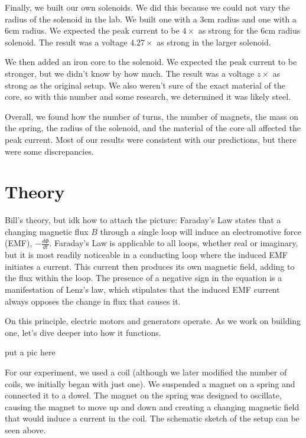 \documentclass[11pt]{article}
\let\oldsection\section
\renewcommand\section{\clearpage\oldsection}
\begin{document}
    Finally, we built our own solenoids.
    We did this because we could not vary the radius of the solenoid in the lab.
    We built one with a 3cm radius and one with a 6cm radius.
    We expected the peak current to be $4 \times$ as strong for the 6cm radius solenoid.
    The result was a voltage $4.27 \times$ as strong in the larger solenoid.

    We then added an iron core to the solenoid.
    We expected the peak current to be stronger, but we didn't know by how much.
    The result was a voltage $z \times$ as strong as the original setup.
    We also weren't sure of the exact material of the core, so with this number and some research, we determined it was likely steel.

    Overall, we found how the number of turns, the number of magnets, the mass on the spring, the radius of the solenoid, and the material of the core all affected the peak current.
    Most of our results were consistent with our predictions, but there were some discrepancies.

    \section*{Theory}\label{sec:theory}


Bill's theory, but idk how to attach the picture:
Faraday’s Law states that a changing magnetic flux \(B\) through a single loop will induce an electromotive force (EMF), \(-\frac{d\Phi}{dt}\). Faraday’s Law is applicable to all loops, whether real or imaginary, but it is most readily noticeable in a conducting loop where the induced EMF initiates a current. This current then produces its own magnetic field, adding to the flux within the loop. The presence of a negative sign in the equation is a manifestation of Lenz’s law, which stipulates that the induced EMF current always opposes the change in flux that causes it. 

On this principle, electric motors and generators operate. As we work on building one, let's dive deeper into how it functions.

put a pic here

For our experiment, we used a coil (although we later modified the number of coils, we initially began with just one). We suspended a magnet on a spring and connected it to a dowel. The magnet on the spring was designed to oscillate, causing the magnet to move up and down and creating a changing magnetic field that would induce a current in the coil. The schematic sketch of the setup can be seen above. 
\end{document}
